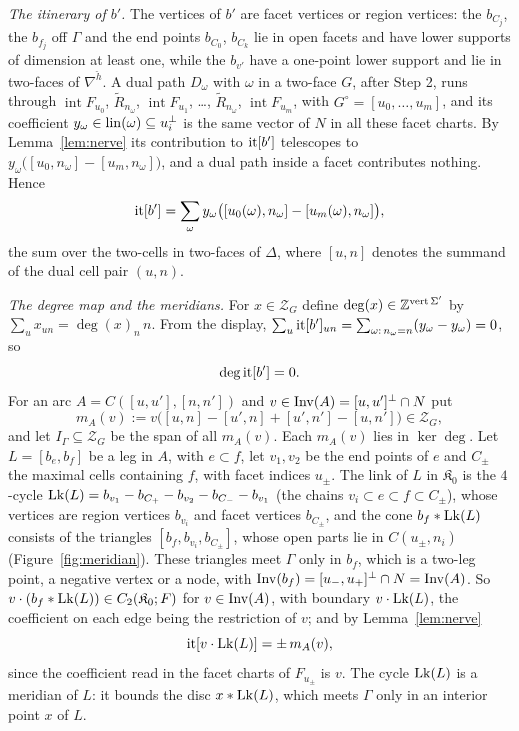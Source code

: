 \emph{The itinerary of $b'$.} The vertices of $b'$ are facet vertices or region vertices: the $b_{C_j}$, the $b_{f_j}$ off
$\Gamma$ and the end points $b_{C_0}$, $b_{C_k}$ lie in open facets and have lower supports of dimension at least one,
while the $b_{v'}$ have a one-point lower support and lie in two-faces of $\nabla^{\check h}$. A dual path $D_\omega$ with
$\omega$ in a two-face $G$, after Step 2, runs through $\operatorname{int}F_{u_0}$, $\widetilde R_{n_\omega}$,
$\operatorname{int}F_{u_1}$, \dots, $\widetilde R_{n_\omega}$, $\operatorname{int}F_{u_m}$, with $G^\circ=[u_0,\dots,u_m]$, and
its coefficient $y_\omega\in\operatorname{lin}(\omega)\subseteq u_i^\perp$ is the same vector of $N$ in all these facet charts. By
Lemma~\ref{lem:nerve} its contribution to $\operatorname{it}[b']$ telescopes to $y_\omega\bigl([u_0,n_\omega]-[u_m,n_\omega]\bigr)$, and
a dual path inside a facet contributes nothing. Hence
\[
\operatorname{it}[b']=\sum_{\omega}y_\omega\bigl([u_{0}(\omega),n_\omega]-[u_{m}(\omega),n_\omega]\bigr),
\]
the sum over the two-cells in two-faces of $\Delta$, where $[u,n]$ denotes the summand of the dual cell pair $(u,n)$.

\emph{The degree map and the meridians.} For $x\in\mathcal Z_G$ define $\deg(x)\in\mathbb Z^{\operatorname{vert}\Sigma'}$ by
$\sum_ux_{un}=\deg(x)_n\,n$. From the display, $\sum_u\operatorname{it}[b']_{un}=\sum_{\omega:\,n_\omega=n}(y_\omega-y_\omega)=0$, so
\[
\deg\operatorname{it}[b']=0.
\]
For an arc $A=C([u,u'],[n,n'])$ and $v\in\operatorname{Inv}(A)=[u,u']^\perp\cap N$ put
\[
m_A(v):=v\bigl([u,n]-[u',n]+[u',n']-[u,n']\bigr)\in\mathcal Z_G,
\]
and let $I_\Gamma\subseteq\mathcal Z_G$ be the span of all $m_A(v)$. Each $m_A(v)$ lies in $\ker\deg$. Let $L=[b_e,b_f]$ be a leg in $A$,
with $e\subset f$, let $v_1,v_2$ be the end points of $e$ and $C_\pm$ the maximal cells containing $f$, with facet indices
$u_\pm$. The link of $L$ in $\mathfrak K_0$ is the $4$-cycle $\operatorname{Lk}(L)=b_{v_1}-b_{C_+}-b_{v_2}-b_{C_-}-b_{v_1}$ (the chains
$v_i\subset e\subset f\subset C_\pm$), whose vertices are region vertices $b_{v_i}$ and facet vertices $b_{C_\pm}$, and the
cone $b_f*\operatorname{Lk}(L)$ consists of the triangles $[b_f,b_{v_i},b_{C_\pm}]$, whose open parts lie in $C(u_\pm,n_i)$ (Figure~\ref{fig:meridian}).
These triangles meet $\Gamma$ only in $b_f$, which is a two-leg point, a negative vertex or a node, with
$\operatorname{Inv}(b_f)=[u_-,u_+]^\perp\cap N=\operatorname{Inv}(A)$. So $v\cdot(b_f*\operatorname{Lk}(L))\in C_2(\mathfrak K_0;F)$ for $v\in\operatorname{Inv}(A)$, with
boundary $v\cdot\operatorname{Lk}(L)$, the coefficient on each edge being the restriction of $v$; and by Lemma~\ref{lem:nerve}
\[
\operatorname{it}[v\cdot\operatorname{Lk}(L)]=\pm\,m_A(v),
\]
since the coefficient read in the facet charts of $F_{u_\pm}$ is $v$. The cycle $\operatorname{Lk}(L)$ is a meridian of $L$: it bounds the
disc $x*\operatorname{Lk}(L)$, which meets $\Gamma$ only in an interior point $x$ of $L$.

